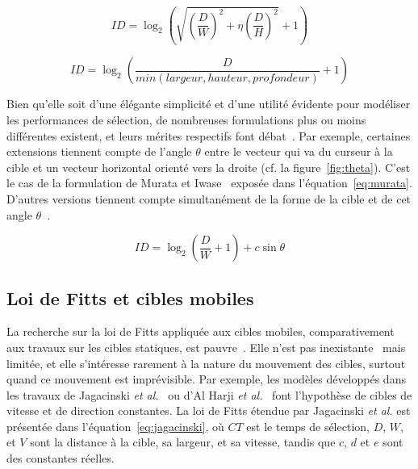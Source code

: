 	\begin{equation}
		\label{eq:accot}
		ID = \log_2\left( \sqrt{ \left( \frac{D}{W} \right) ^2 + \eta \left( \frac{D}{H} \right) ^2}  + 1\right)
	\end{equation}
	
	\begin{equation}
		\label{eq:ware}
		ID = \log_2\left( \frac{D}{min(largeur,hauteur,profondeur)} + 1\right)
	\end{equation}
	
	Bien qu'elle soit d'une élégante simplicité et d'une utilité évidente pour modéliser les performances de sélection, de nombreuses formulations plus ou moins différentes existent, et leurs mérites respectifs font débat~\cite{casallas2015prediction}. Par exemple, certaines extensions tiennent compte de l'angle $\theta$ entre le vecteur qui va du curseur à la cible et un vecteur horizontal orienté vers la droite (cf. la figure~\ref{fig:theta}). C'est le cas de la formulation de Murata et Iwase~\cite{murata2001extending} exposée dans l'équation~\ref{eq:murata}. D'autres versions tiennent compte simultanément de la forme de la cible et de cet angle $\theta$~\cite{appert2008evaluation, grossman2004pointing}.
	
	\begin{equation}
		\label{eq:murata}
		ID = \log_2\left(\frac{D}{W} + 1\right) + c \sin \theta
	\end{equation}
	
	\subsection{Loi de Fitts et cibles mobiles}
	\label{sub:fittsMobile}
	La recherche sur la loi de Fitts appliquée aux cibles mobiles, comparativement aux travaux sur les cibles statiques, est pauvre~\cite{casallas2015prediction}. Elle n'est pas inexistante~\cite{jagacinski1980test, hoffmann1991capture, hajri2011moving} mais limitée, et elle s'intéresse rarement à la nature du mouvement des cibles, surtout quand ce mouvement est imprévisible. Par exemple, les modèles développés dans les travaux de Jagacinski \emph{et al.}~\cite{jagacinski1980test} ou d'Al Harji \emph{et al.}~\cite{hajri2011moving} font l'hypothèse de cibles de vitesse et de direction constantes. La loi de Fitts étendue par Jagacinski \emph{et al.} est présentée dans l'équation~\ref{eq:jagacinski}, où $CT$ est le temps de sélection, $D$, $W$, et $V$ sont la distance à la cible, sa largeur, et sa vitesse, tandis que $c$, $d$ et $e$ sont des constantes réelles.
	
